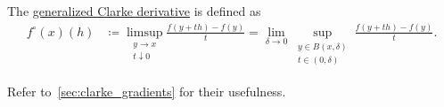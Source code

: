 \begin{definition}
\begin{defenum}
    \item\label{def:banach_space_derivatives/clarke}\cite[Section 10.1]{Clarke2013} The \uline{generalized Clarke derivative} is defined as
    \begin{align*}
      f^\circ(x)(h)
      &\coloneqq
      \limsup_{\substack{y \to x \\ t \downarrow 0}} \frac {f(y + th) - f(y)} t
      =
      \lim_{\delta \to 0} \sup_{\substack{y \in B(x, \delta) \\ t \in (0, \delta)}} \frac {f(y + th) - f(y)} t.
    \end{align*}

    Refer to~\cref{sec:clarke_gradients} for their usefulness.
  \end{defenum}
\end{definition}

